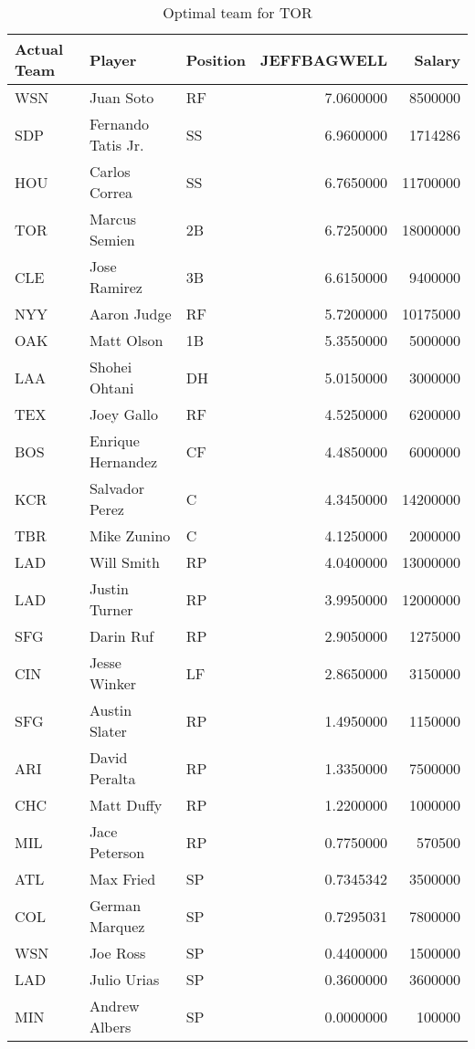\begin{table}

\caption{Optimal team for TOR}
\centering
\begin{tabular}[t]{l|l|l|r|r}
\hline
Actual Team & Player & Position & JEFFBAGWELL & Salary\\
\hline
WSN & Juan Soto & RF & 7.0600000 & 8500000\\
\hline
SDP & Fernando Tatis Jr. & SS & 6.9600000 & 1714286\\
\hline
HOU & Carlos Correa & SS & 6.7650000 & 11700000\\
\hline
TOR & Marcus Semien & 2B & 6.7250000 & 18000000\\
\hline
CLE & Jose Ramirez & 3B & 6.6150000 & 9400000\\
\hline
NYY & Aaron Judge & RF & 5.7200000 & 10175000\\
\hline
OAK & Matt Olson & 1B & 5.3550000 & 5000000\\
\hline
LAA & Shohei Ohtani & DH & 5.0150000 & 3000000\\
\hline
TEX & Joey Gallo & RF & 4.5250000 & 6200000\\
\hline
BOS & Enrique Hernandez & CF & 4.4850000 & 6000000\\
\hline
KCR & Salvador Perez & C & 4.3450000 & 14200000\\
\hline
TBR & Mike Zunino & C & 4.1250000 & 2000000\\
\hline
LAD & Will Smith & RP & 4.0400000 & 13000000\\
\hline
LAD & Justin Turner & RP & 3.9950000 & 12000000\\
\hline
SFG & Darin Ruf & RP & 2.9050000 & 1275000\\
\hline
CIN & Jesse Winker & LF & 2.8650000 & 3150000\\
\hline
SFG & Austin Slater & RP & 1.4950000 & 1150000\\
\hline
ARI & David Peralta & RP & 1.3350000 & 7500000\\
\hline
CHC & Matt Duffy & RP & 1.2200000 & 1000000\\
\hline
MIL & Jace Peterson & RP & 0.7750000 & 570500\\
\hline
ATL & Max Fried & SP & 0.7345342 & 3500000\\
\hline
COL & German Marquez & SP & 0.7295031 & 7800000\\
\hline
WSN & Joe Ross & SP & 0.4400000 & 1500000\\
\hline
LAD & Julio Urias & SP & 0.3600000 & 3600000\\
\hline
MIN & Andrew Albers & SP & 0.0000000 & 100000\\
\hline
\end{tabular}
\end{table}
